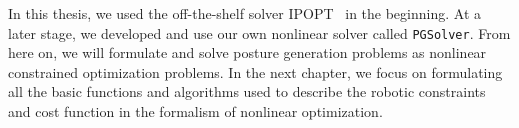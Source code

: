 In this thesis, we used the off-the-shelf solver IPOPT~\cite{wachter:mathprog:2006} in the beginning.
At a later stage, we developed and use our own nonlinear solver called {\tt PGSolver}.
From here on, we will formulate and solve posture generation problems as nonlinear constrained optimization problems.
In the next chapter, we focus on formulating all the basic functions and algorithms used to describe the robotic constraints and cost function in the formalism of nonlinear optimization.
